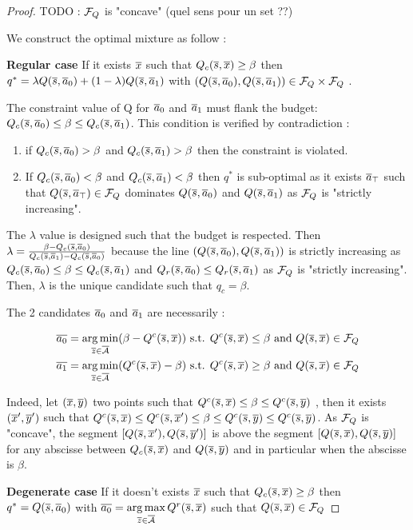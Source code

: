 \begin{proof}
TODO : $\mathcal{F}_Q$ is "concave" (quel sens pour un set ??)

We construct the optimal mixture as follow : 

\textbf{Regular case} If it exists $\overline{x}$ such that $Q_c(\overline{s},\overline{x}) \geq \beta$ then $q^* = \lambda Q(\overline{s},\overline{a}_0) + (1-\lambda) Q(\overline{s},\overline{a}_1)$ with $(Q(\overline{s},\overline{a}_0),Q(\overline{s},\overline{a}_1)) \in \mathcal{F}_Q\times \mathcal{F}_Q$ .

The constraint value of Q for $\overline{a}_0$ and $\overline{a}_1$ must flank the budget: $Q_c(\overline{s},\overline{a}_0) \leq \beta \leq Q_c(\overline{s},\overline{a}_1)$. This condition  is verified by contradiction : 

\begin{enumerate}
    \item if $Q_c(\overline{s},\overline{a}_0) > \beta$ and $Q_c(\overline{s},\overline{a}_1) > \beta$ then the constraint is violated.
    \item If $Q_c(\overline{s},\overline{a}_0) < \beta$ and $Q_c(\overline{s},\overline{a}_1) < \beta$ then $q^*$ is sub-optimal as it exists $\overline{a}_\top$ such that $Q(\overline{s},\overline{a}_\top) \in \mathcal{F}_Q$ dominates $Q(\overline{s},\overline{a}_0)$ and $Q(\overline{s},\overline{a}_1)$ as $\mathcal{F}_Q$ is "strictly increasing".
\end{enumerate}

The $\lambda$ value is designed such that the budget is respected. Then  $\lambda = \frac{\beta - Q_c(\overline{s},\overline{a}_0) }{Q_c(\overline{s},\overline{a}_1) - Q_c(\overline{s},\overline{a}_0)}$ because the line $(Q(\overline{s},\overline{a}_0),Q(\overline{s},\overline{a}_1))$ is strictly increasing as  $Q_c(\overline{s},\overline{a}_0) \leq \beta \leq Q_c(\overline{s},\overline{a}_1)$ and $Q_r(\overline{s},\overline{a}_0) \leq Q_r(\overline{s},\overline{a}_1)$ as $\mathcal{F}_Q$ is "strictly increasing". Then,  $\lambda$ is the unique candidate such that $q_c = \beta$. 



The 2 candidates $\overline{a}_0$ and $\overline{a}_1$ are necessarily :

\begin{align}
\overline{a_0} = \operatorname*{arg\,min}\limits_{\overline{z} \in \overline{\mathcal{A}}} (\beta - Q^c(\overline{s},\overline{x}))
 \text{ s.t. } Q^c(\overline{s},\overline{x}) \leq \beta
\text{ and } Q(\overline{s},\overline{x}) \in\mathcal{F}_Q\\
\overline{a_1} = \operatorname*{arg\,min}\limits_{\overline{z} \in \overline{\mathcal{A}}} (Q^c(\overline{s},\overline{x}) - \beta)
 \text{ s.t. } Q^c(\overline{s},\overline{x}) \geq \beta
\text{ and } Q(\overline{s},\overline{x}) \in\mathcal{F}_Q
\end{align}

Indeed, let $(\overline{x},\overline{y})$ two points such that $Q^c(\overline{s},\overline{x}) \leq \beta \leq Q^c(\overline{s},\overline{y})$ , then it exists $(\overline{x}',\overline{y}')$ such that $Q^c(\overline{s},\overline{x}) \leq Q^c(\overline{s},\overline{x}') \leq \beta \leq Q^c(\overline{s},\overline{y}) \leq Q^c(\overline{s},\overline{y})$. As $\mathcal{F}_Q$ is "concave", the segment $[Q(\overline{s},\overline{x}'),Q(\overline{s},\overline{y}')]$ is above the segment  $[Q(\overline{s},\overline{x}),Q(\overline{s},\overline{y})]$ for any abscisse between $Q_c(\overline{s},\overline{x})$ and $Q(\overline{s},\overline{y})$ and in particular when the abscisse is $\beta$.



\textbf{Degenerate case} If it doesn't exists $\overline{x}$ such that $Q_c(\overline{s},\overline{x}) \geq \beta$ then  $q^* =  Q(\overline{s},\overline{a}_0)$ with $\overline{a_0} = \operatorname*{arg\,max}\limits_{\overline{z} \in \overline{\mathcal{A}}} Q^r(\overline{s},\overline{x})$ such that $Q(\overline{s},\overline{x}) \in \mathcal{F}_Q$

\end{proof}



